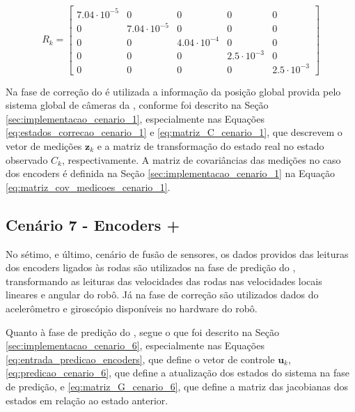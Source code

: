 \documentclass[acronym, symbols, table, deposito]{fei}
\begin{document}
			\begin{equation}\label{eq:matriz_cov_processo_cenario_6}
				R_{k} = \begin{bmatrix}
					7.04\cdot10^{-5} & 0 & 0 & 0 & 0 \\
					0 & 7.04\cdot10^{-5} & 0 & 0 & 0 \\
					0 & 0 & 4.04\cdot10^{-4} & 0 & 0 \\
					0 & 0 & 0 & 2.5\cdot10^{-3} & 0 \\
					0 & 0 & 0 & 0 & 2.5\cdot10^{-3}
				\end{bmatrix}
			\end{equation}
		
			Na fase de correção do  é utilizada a informação da posição global provida pelo sistema global de câmeras da , conforme foi descrito na Seção \ref{sec:implementacao_cenario_1}, especialmente nas Equações \eqref{eq:estados_correcao_cenario_1} e \eqref{eq:matriz_C_cenario_1}, que descrevem o vetor de medições $\textbf{z}_{k}$ e a matriz de transformação do estado real no estado observado $C_{k}$, respectivamente. A matriz de covariâncias das medições no caso dos encoders é definida na Seção \ref{sec:implementacao_cenario_1} na Equação \eqref{eq:matriz_cov_medicoes_cenario_1}.
			
		\subsection{Cenário 7 - Encoders + } \label{sec:implementacao_cenario_7}
		
			No sétimo, e último, cenário de fusão de sensores, os dados providos das leituras dos encoders ligados às rodas são utilizados na fase de predição do , transformando as leituras das velocidades das rodas nas velocidades locais lineares e angular do robô. Já na fase de correção são utilizados dados do acelerômetro e giroscópio disponíveis no hardware do robô.
			
			Quanto à fase de predição do , segue o que foi descrito na Seção \ref{sec:implementacao_cenario_6}, especialmente nas Equações \eqref{eq:entrada_predicao_encoders}, que define o vetor de controle $\textbf{u}_k$, \eqref{eq:predicao_cenario_6}, que define a atualização dos estados do sistema na fase de predição, e \eqref{eq:matriz_G_cenario_6}, que define a matriz das jacobianas dos estados em relação ao estado anterior.
			
\end{document}
